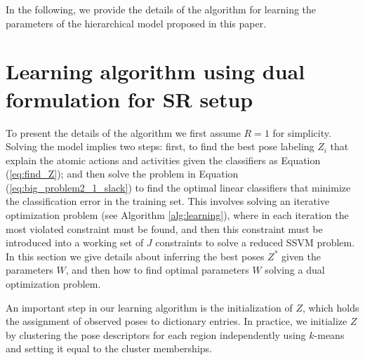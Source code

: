In the following, we provide the details of the algorithm for learning the
parameters of the hierarchical model proposed in this paper.

\section{Learning algorithm using dual formulation for SR setup} \label{subsec:learning}
To present the details of the algorithm we first assume $R=1$ for simplicity. Solving the model implies two steps: first, to find the best pose labeling $Z_i$ that explain the atomic actions and activities given the classifiers as Equation (\ref{eq:find_Z}); and then solve the problem in Equation (\ref{eq:big_problem2_1_slack}) to find the optimal linear classifiers that minimize the classification error in the training set. This involves solving an iterative optimization problem (see Algorithm \ref{alg:learning}), where in each iteration the most violated constraint must be found, and then this constraint must be introduced into a working set of $J$ constraints to solve a reduced SSVM problem. In this section we give details about inferring the best poses $Z^*$ given the parameters $W$, and then how to find optimal parameters $W$ solving a dual optimization problem.

An important step in our learning algorithm is the initialization of $Z$,
which holds the assignment of observed poses to dictionary entries.
In practice, we initialize $Z$ by clustering the pose descriptors for each
region independently using $k$-means and setting it equal
to the cluster memberships. 

%
